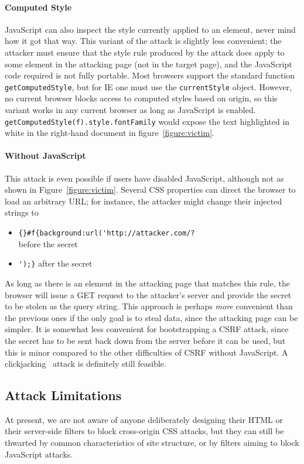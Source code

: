 \documentclass{acm_proc_article-sp}
\begin{document}
\paragraph{Computed Style}
JavaScript can also inspect the style currently applied to an element,
never mind how it got that way.  This variant of the attack is
slightly less convenient; the attacker must ensure that the style rule
produced by the attack does apply to some element in the attacking
page (not in the target page), and the JavaScript code required is not
fully portable.  Most browsers support the standard function
\texttt{getComputedStyle}, but for IE one must use the
\texttt{currentStyle} object.  However, no current browser blocks
access to computed styles based on origin, so this variant works in
any current browser as long as JavaScript is enabled.
\texttt{getComputedStyle(f).style.fontFamily} would expose the text
highlighted in white in the right-hand document in
figure~\ref{figure:victim}.

\paragraph{Without JavaScript}
This attack is even possible if users have disabled JavaScript,
although not as shown in Figure~\ref{figure:victim}.  Several CSS
properties can direct the browser to load an arbitrary URL; for
instance, the attacker might change their injected strings to

\begin{itemize}
\item \verb|{}#f{background:url('http://attacker.com/?|\\
  before the secret
\item \verb|');}| after the secret
\end{itemize}

As long as there is an element in the attacking page that matches this
rule, the browser will issue a GET request to the attacker's server
and provide the secret to be stolen as the query string.  This
approach is perhaps \emph{more} convenient than the previous ones if
the only goal is to steal data, since the attacking page can be
simpler.  It is somewhat less convenient for bootstrapping a CSRF
attack, since the secret has to be sent back down from the server
before it can be used, but this is minor compared to the other
difficulties of CSRF without JavaScript.  A
clickjacking~\cite{clickjacking} attack is definitely still feasible.

\subsection{Attack Limitations} \label{sec:limits}
At present, we are not aware of anyone deliberately designing their
HTML or their server-side filters to block cross-origin CSS attacks,
but they can still be thwarted by common characteristics of site
structure, or by filters aiming to block JavaScript attacks.
\end{document}
